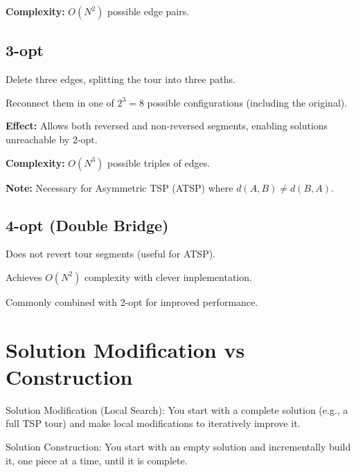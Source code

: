 \textbf{Complexity:} $O(N^2)$ possible edge pairs.

\subsection*{3-opt}
\begin{tightitemize}
    \item Delete three edges, splitting the tour into three paths.
    \item Reconnect them in one of $2^3 = 8$ possible configurations (including the original).
\end{tightitemize}
\textbf{Effect:} Allows both reversed and non-reversed segments, enabling solutions unreachable by 2-opt.  

\textbf{Complexity:} $O(N^3)$ possible triples of edges.  

\textbf{Note:} Necessary for Asymmetric TSP (ATSP) where $d(A,B) \neq d(B,A)$.

\subsection*{4-opt (Double Bridge)}
\begin{tightitemize}
    \item Does not revert tour segments (useful for ATSP).
    \item Achieves $O(N^2)$ complexity with clever implementation.
    \item Commonly combined with 2-opt for improved performance.
\end{tightitemize}

\section*{Solution Modification vs Construction}

\begin{tightitemize}
    \item Solution Modification (Local Search):
    You start with a complete solution (e.g., a full TSP tour) and make local 
    modifications  to iteratively improve it.
    \item Solution Construction:  You start with an empty solution and 
    incrementally build it, one piece at a time, until it is complete.
\end{tightitemize}

